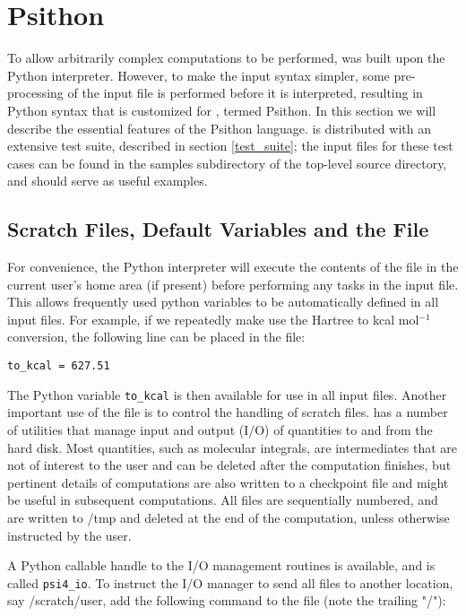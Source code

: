 \section{Psithon} \label{psithon}
 
To allow arbitrarily complex computations to be performed, \PSIfour was built
upon the Python interpreter. However, to make the input syntax simpler, some
pre-processing of the input file is performed before it is interpreted,
resulting in Python syntax that is customized for \PSI, termed Psithon.  In
this section we will describe the essential features of the Psithon language.
\PSIfour is distributed with an extensive test suite, described in section
\ref{test_suite}; the input files for these test cases can be found in the
samples subdirectory of the top-level \PSIfour source directory, and should
serve as useful examples.

\subsection{Scratch Files, Default Variables and the \psirc File}
For convenience, the Python interpreter will execute the contents of the
\psirc file in the current user's home area (if present) before performing any
tasks in the input file.  This allows frequently used python variables to be
automatically defined in all input files.  For example, if we repeatedly make
use the Hartree to kcal mol$^{-1}$ conversion, the following line can be placed
in the \psirc file:

\begin{verbatim}
to_kcal = 627.51
\end{verbatim}

The Python variable {\tt to\_kcal} is then available for use in all \PSIfour
input files.  Another important use of the \psirc file is to control the
handling of scratch files.  \PSIfour has a number of utilities that manage
input and output (I/O) of quantities to and from the hard disk.  Most
quantities, such as molecular integrals, are intermediates that are not of
interest to the user and can be deleted after the computation finishes, but
pertinent details of computations are also written to a checkpoint file and
might be useful in subsequent computations.  All files are sequentially
numbered, and are written to /tmp and deleted at the end of the computation,
unless otherwise instructed by the user.

A Python callable handle to the \PSIfour I/O management routines is available,
and is called {\tt psi4\_io}.  To instruct the I/O manager to send all files to
another location, say /scratch/user, add the following command to the \psirc
file (note the trailing "/"):

